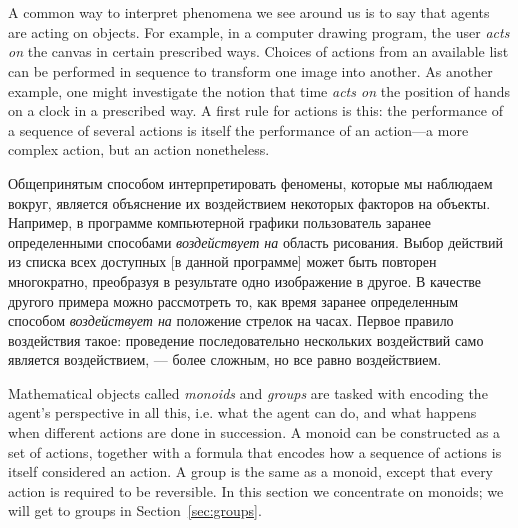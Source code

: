 \documentclass[../main/CT4S-EN-RU]{subfiles}
\begin{document}
\section{}\label{sec:monoids}

\begin{blockENG}
A common way to interpret phenomena we see around us is to say that agents are acting on objects. For example, in a computer drawing program, the user {\em acts on} the canvas in certain prescribed ways. Choices of actions from an available list can be performed in sequence to transform one image into another. As another example, one might investigate the notion that time {\em acts on} the position of hands on a clock in a prescribed way. A first rule for actions is this: the performance of a sequence of several actions is itself the performance of an action—a more complex action, but an action nonetheless.
\end{blockENG}

\begin{blockRUS}
Общепринятым способом интерпретировать феномены, которые мы наблюдаем вокруг, является объяснение их воздействием некоторых факторов на объекты. Например, в программе компьютерной графики пользователь заранее определенными способами {\em воздействует на} область рисования. Выбор действий из списка всех доступных [в данной программе] может быть повторен многократно, преобразуя в результате одно изображение в другое. В качестве другого примера можно рассмотреть то, как время заранее определенным способом {\em воздействует на} положение стрелок на часах. Первое правило воздействия такое: проведение последовательно нескольких воздействий само является воздействием, — более сложным, но все равно воздействием.
\end{blockRUS}

\begin{blockENG}
Mathematical objects called {\em monoids} and {\em groups} are tasked with encoding the agent's perspective in all this, i.e. what the agent can do, and what happens when different actions are done in succession. A monoid can be constructed as a set of actions, together with a formula that encodes how a sequence of actions is itself considered an action. A group is the same as a monoid, except that every action is required to be reversible. In this section we concentrate on monoids; we will get to groups in Section~\ref{sec:groups}.
\end{blockENG}
\end{document}
